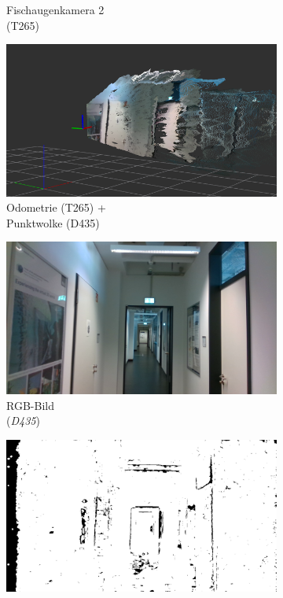 \begin{figure}[h!]
\begin{subfigure}[b]{0.3\linewidth}
		\caption{Fischaugenkamera 2 \\ (T265)}
	\end{subfigure}
	\medskip
	\begin{subfigure}[b]{0.3\linewidth}
		\centering
	\includegraphics[width=\linewidth]{images/dataset/pointcloud1.png}
	\caption{Odometrie  (T265) + \\ Punktwolke (D435)}
	\end{subfigure}
	\hfill
	\begin{subfigure}[b]{0.3\linewidth}
		\centering
		\includegraphics[width=\linewidth]{images/dataset/dc_frame000005.png}
		\caption{RGB-Bild \\ (\textit{D435}) \hspace*{2cm}}
	\end{subfigure}
	\hfill
	\begin{subfigure}[b]{0.3\linewidth}
		\centering
		\includegraphics[width=\linewidth]{images/dataset/dt_frame000005.png}

\end{subfigure}
\end{figure}
